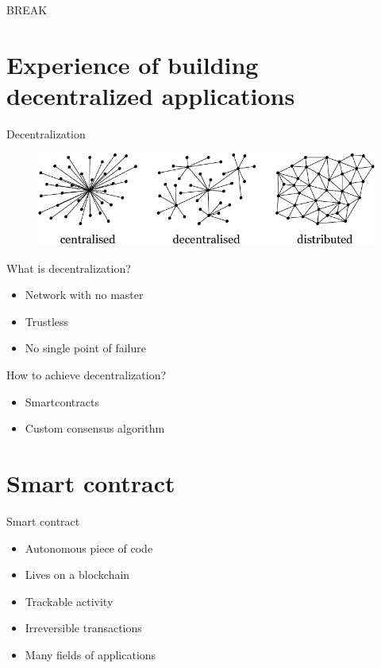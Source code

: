 \documentclass[12pt]{beamer}
\begin{document}
  \begin{frame}[standout]
    BREAK
  \end{frame}

  \section{Experience of building decentralized applications}

  \begin{frame}{Decentralization}
    \begin{figure}
      \includegraphics[height=.5\textheight]{images/centralised-decentralised-distributed}
    \end{figure}
  \end{frame}

  \begin{frame}{What is decentralization?}
    \begin{itemize}
      \item Network with \alert{no master}
      \item \alert{Trustless}
      \item No single point of failure
    \end{itemize}
  \end{frame}


  \begin{frame}{How to achieve decentralization?}
    \begin{itemize}
      \item \alert{Smartcontracts}
      \item Custom \alert{consensus} algorithm
    \end{itemize}
  \end{frame}




  \section{Smart contract}

  \begin{frame}{Smart contract}
    \begin{itemize}
      \item \alert{Autonomous} piece of code
      \item Lives on a \alert{blockchain}
      \item \alert{Trackable} activity
      \item \alert{Irreversible} transactions
      \item Many fields of applications
    \end{itemize}
  \end{frame}
\end{document}
